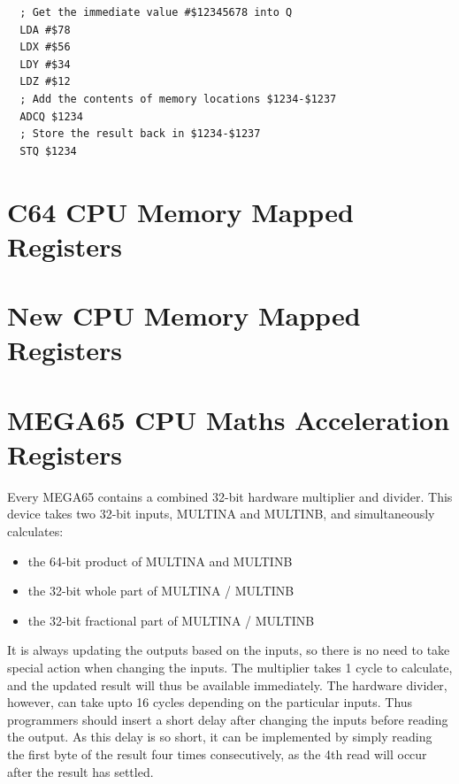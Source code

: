 \begin{tcolorbox}[colback=black,coltext=white]
\verbatimfont{\codefont}
\begin{verbatim}
  ; Get the immediate value #$12345678 into Q
  LDA #$78
  LDX #$56
  LDY #$34
  LDZ #$12  
  ; Add the contents of memory locations $1234-$1237
  ADCQ $1234
  ; Store the result back in $1234-$1237
  STQ $1234  
\end{verbatim}
\end{tcolorbox}


\section{C64 CPU Memory Mapped Registers}



\section{New CPU Memory Mapped Registers}



\section{MEGA65 CPU Maths Acceleration Registers}

Every MEGA65 contains a combined 32-bit hardware multiplier and divider.
This device takes two 32-bit inputs, MULTINA and MULTINB, and simultaneously calculates:

\begin{itemize}
\item the 64-bit product of MULTINA and MULTINB
\item the 32-bit whole part of MULTINA / MULTINB
\item the 32-bit fractional part of MULTINA / MULTINB
\end{itemize}

It is always updating the outputs based on the inputs, so there is no need to take special action when changing the inputs.
The multiplier takes 1 cycle to calculate, and the updated result will thus be available immediately. The hardware divider,
however, can take upto 16 cycles depending on the particular inputs.  Thus programmers should insert a short delay after
changing the inputs before reading the output.  As this delay is so short, it can be implemented by simply reading the first
byte of the result four times consecutively, as the 4th read will occur after the result has settled.

